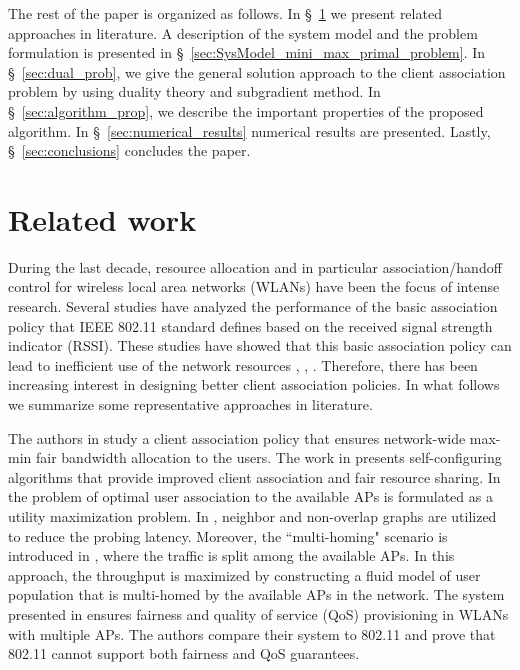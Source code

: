 \documentclass[journal, 10pt, twocolumn]{IEEEtran}
\begin{document}
The rest of the paper is organized as follows. In \S~\ref{sec:Related_work} we present related approaches in literature. A description of the system model and the problem formulation is presented in \S~\ref{sec:SysModel_mini_max_primal_problem}. In \S~\ref{sec:dual_prob}, we give the general solution approach to the client association problem by using duality theory and subgradient method. In \S~\ref{sec:algorithm_prop}, we describe the important properties of the proposed algorithm. In \S~\ref{sec:numerical_results} numerical results are presented. Lastly, \S~\ref{sec:conclusions} concludes the paper.

\section{Related work}\label{sec:Related_work}
During the last decade, resource allocation and in particular association/handoff control for wireless local area networks (WLANs) have been the focus of intense research. Several studies have analyzed the performance of the basic association policy that IEEE 802.11 standard defines based on the received signal strength indicator (RSSI). These studies have showed that this basic association policy can lead to inefficient use of the network resources \cite{Bejerano1}, \cite{Arbaugh}, \cite{Bejerano2}. Therefore, there has been increasing interest in designing better client association policies. In what follows we summarize some representative approaches in literature.

The authors in \cite{Bejerano2} study a client association policy that ensures network-wide max-min fair bandwidth allocation to the users. The work in \cite{Kauffmann} presents self-configuring algorithms that provide improved client association and fair resource sharing. In \cite{Kumar05} the problem of optimal user association to the available APs is formulated as a utility maximization problem. In \cite{Shin}, neighbor and non-overlap graphs are utilized to reduce the probing latency. Moreover, the ``multi-homing" scenario is introduced in \cite{Shakkottai}, where the traffic is split among the available APs. In this approach, the throughput is maximized by constructing a fluid model of user population that is multi-homed by the available APs in the network. The system presented in \cite{Bejerano1} ensures fairness and quality of service (QoS) provisioning in WLANs with multiple APs. The authors compare their system to 802.11 and prove that 802.11 cannot support both fairness and QoS guarantees.
\end{document}
